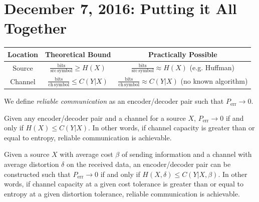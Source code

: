 \documentclass[11pt]{article}
\theoremstyle{definition}
\begin{document}
\section{December 7, 2016: Putting it All Together}
\begin{table}[h]
	\begin{tabular}{|c|c|c|}
		\hline
		 Location & Theoretical Bound & Practically Possible \\
		 \hline
		 Source & $\frac{\mathrm{bits}}{\mathrm{src \, symbol}} \geq H(X)$ & $\frac{\mathrm{bits}}{\mathrm{src \, symbol}} \approx H(X)$ (e.g. Huffman)\\
		 \hline
		 Channel & $\frac{\mathrm{bits}}{\mathrm{ch \, symbol}} \leq C(Y|X)$ & $\frac{\mathrm{bits}}{\mathrm{ch \, symbol}} \approx C(Y|X)$ (no known algorithm)\\
		 \hline
	\end{tabular}
\end{table}

We define {\it reliable communication} as an encoder/decoder pair such that $P_{\mathrm{err}} \to 0$.

 Given any encoder/decoder pair and a channel for a source $X$, $P_{\mathrm{err}} \to 0$ if and only if $H(X) \leq C(Y|X)$. In other words, if channel capacity is greater than or equal to entropy, reliable communication is achievable.

 Given a source $X$ with average cost $\beta$ of sending information and a channel with average distortion $\delta$ on the received data, an encoder/decoder pair can be constructed such that $P_{\mathrm{err}} \to 0$ if and only if $H(X, \delta) \leq C(Y|X, \beta)$. In other words, if channel capacity at a given cost tolerance is greater than or equal to entropy at a given distortion tolerance, reliable communication is achievable.
\newpage
\end{document}
